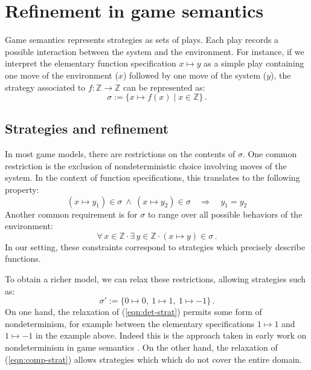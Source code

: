 \documentclass[11pt,oneside]{book}
\theoremstyle{definition}
\newcommand{\bdot}{\boldsymbol{\cdot}}
\begin{document}
\section{Refinement in game semantics} \label{sec:refgs} %

Game semantics represents strategies as sets of plays.
Each play records a possible interaction between
the system and the environment.
For instance,
if we interpret the elementary function specification
$x \mapsto y$
as a simple play
containing one move of the environment ($x$)
followed by one move of the system ($y$),
the strategy associated to $f : \mathbb{Z} \rightarrow \mathbb{Z}$
can be represented as:
\[
  \sigma := \{ x \mapsto f(x) \mid x \in \mathbb{Z} \}
  \,.
\]

\subsection{Strategies and refinement} %

In most game models,
there are restrictions on the contents of $\sigma$.
One common restriction is
the exclusion of nondeterministic choice
involving moves of the system.
In the context of function specifications,
this translates to the following property:
\begin{equation}
  (x \mapsto y_1) \in \sigma \: \wedge \: (x \mapsto y_2) \in \sigma
  \quad \Rightarrow \quad
  y_1 = y_2
  \label{eqn:det-strat}
\end{equation}
Another common requirement is
for $\sigma$ to range over all possible behaviors of the environment:
\begin{equation}
  \forall \, x \in \mathbb{Z} \, \bdot \,
  \exists \, y \in \mathbb{Z} \, \bdot \,
  (x \mapsto y) \in \sigma
  \,.
  \label{eqn:comp-strat}
\end{equation}
In our setting,
these constraints correspond to
strategies which precisely describe functions.

To obtain a richer model,
we can relax these restrictions,
allowing strategies such as:
\[
  \sigma' :=
  \{ 0 \mapsto 0, \: 1 \mapsto 1 , \: 1 \mapsto -1 \}
  \,.
\]
On one hand,
the relaxation of (\ref{eqn:det-strat})
permits some form of nondeterminism,
for example between the elementary specifications
$1 \mapsto 1$ and $1 \mapsto -1$
in the example above.
Indeed this is the approach taken in early work
on nondeterminism in game semantics \citep{gsfnd}.
On the other hand,
the relaxation of (\ref{eqn:comp-strat})
allows strategies which which do not
cover the entire domain.
\end{document}
